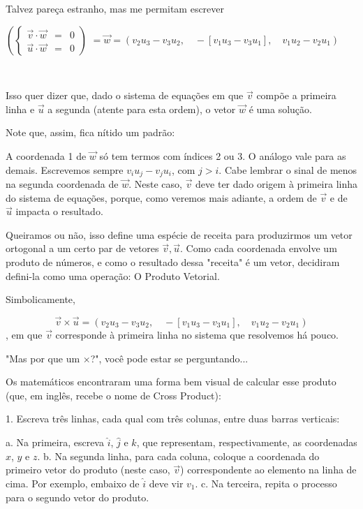 Talvez pareça estranho, mas me permitam escrever

\( \left( \left \{ \begin{array}{rcl} \vec{v} \cdot \vec{w} &=& 0 \\ \vec{u} \cdot \vec{w} &=& 0  \end{array} \right. \right) \) \( =  \vec{w} = (v_2u_3 - v_3u_2,\quad -[v_1u_3 - v_3u_1],\quad v_1u_2 - v_2u_1) \)

 

Isso quer dizer que, dado o sistema de equações em que \(\vec{v}\) compõe a primeira linha e \(\vec{u}\) a segunda (atente para esta ordem), o vetor \(\vec{w}\) é uma solução.

Note que, assim, fica nítido um padrão:

A coordenada 1 de \(\vec{w}\) só tem termos com índices 2 ou 3. O análogo vale para as demais.
Escrevemos sempre \(v_iu_j - v_ju_i\), com \(j > i\). Cabe lembrar o sinal de menos na segunda coordenada de \(\vec{w}\). Neste caso, \(\vec{v}\) deve ter dado origem à primeira linha do sistema de equações, porque, como veremos mais adiante, a ordem de \(\vec{v}\) e de \(\vec{u}\) impacta o resultado.

Queiramos ou não, isso define uma espécie de receita para produzirmos um vetor ortogonal a um certo par de vetores \(\vec{v}, \vec{u}\). Como cada coordenada envolve um produto de números, e como o resultado dessa "receita" é um vetor, decidiram defini-la como uma operação: O Produto Vetorial.

Simbolicamente,

\[
\vec{v} \times \vec{u} = (v_2u_3 - v_3u_2,\quad -[v_1u_3 - v_3u_1],\quad v_1u_2 - v_2u_1)
\], em que \(\vec{v}\) corresponde à primeira linha no sistema que resolvemos há pouco.

"Mas por que um \(\times\)?", você pode estar se perguntando...

Os matemáticos encontraram uma forma bem visual de calcular esse produto (que, em inglês, recebe o nome de Cross Product):



1. Escreva três linhas, cada qual com três colunas, entre duas barras verticais:

a. Na primeira, escreva \(\hat{i}\), \(\hat{j}\) e \(\hat{k}\), que representam, respectivamente, as coordenadas \(x\), \(y\) e \(z\).
b. Na segunda linha, para cada coluna, coloque a coordenada do primeiro vetor do produto (neste caso, \(\vec{v}\)) correspondente ao elemento na linha de cima. Por exemplo, embaixo de \(\hat{i}\) deve vir \(v_1\).
c. Na terceira, repita o processo para o segundo vetor do produto.

